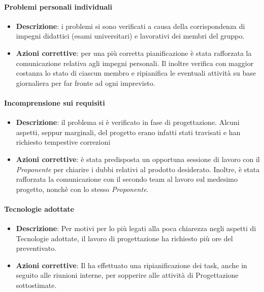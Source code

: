 \paragraph{Problemi personali individuali}
\begin{itemize}
	\item \textbf{Descrizione}: i problemi si sono verificati a causa della corrispondenza di impegni didattici (esami universitari) e lavorativi dei membri del gruppo.
	\item \textbf{Azioni correttive}: per una più corretta pianificazione è stata rafforzata la comunicazione relativa agli impegni personali. Il \textit{\Res} inoltre verifica con maggior costanza lo stato di ciascun membro e ripianifica le eventuali attività su base giornaliera per far fronte ad ogni imprevisto.
\end{itemize}

\paragraph{Incomprensione sui requisiti}
\begin{itemize}
	\item \textbf{Descrizione}: il problema si è verificato in fase di progettazione. Alcuni aspetti, seppur marginali, del progetto erano infatti stati travisati e han richiesto tempestive correzioni
	\item \textbf{Azioni correttive}: è stata predisposta un opportuna sessione di lavoro con il \textit{Proponente} per chiarire i dubbi relativi al prodotto desiderato. Inoltre, è stata rafforzata la comunicazione con il secondo team al lavoro sul medesimo progetto, nonchè con lo stesso \textit{Proponente}.
\end{itemize}

\paragraph{Tecnologie adottate}
\begin{itemize}
	\item \textbf{Descrizione}: Per motivi per lo più legati alla poca chiarezza negli aspetti di Tecnologie adottate, il lavoro di progettazione ha richiesto più ore del preventivato.
	\item \textbf{Azioni correttive}: Il \textit{\Res} ha effettuato una ripianificazione dei task, anche in seguito alle riunioni interne, per sopperire alle attività di Progettazione sottostimate.
\end{itemize}
